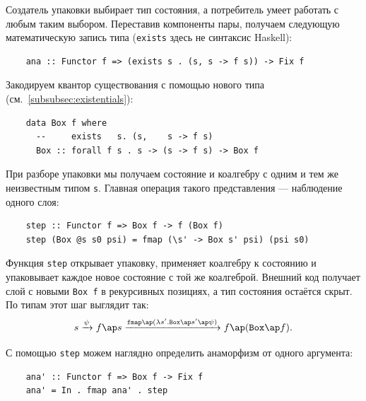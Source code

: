Создатель упаковки выбирает тип состояния, а потребитель умеет работать с любым таким выбором.
Переставив компоненты пары, получаем следующую математическую запись типа (\texttt{exists} здесь не синтаксис Haskell):
\begin{verbatim}
    ana :: Functor f => (exists s . (s, s -> f s)) -> Fix f
\end{verbatim}
Закодируем квантор существования с помощью нового типа (см.~\ref{subsubsec:existentials}):
\begin{verbatim}
    data Box f where
      --     exists   s. (s,    s -> f s)
      Box :: forall f s . s -> (s -> f s) -> Box f
\end{verbatim}

При разборе упаковки мы получаем состояние и коалгебру с одним и тем же неизвестным типом \texttt{s}.
Главная операция такого представления --- наблюдение одного слоя:
\begin{verbatim}
    step :: Functor f => Box f -> f (Box f)
    step (Box @s s0 psi) = fmap (\s' -> Box s' psi) (psi s0)
\end{verbatim}
Функция \texttt{step} открывает упаковку, применяет коалгебру к состоянию и упаковывает каждое новое состояние с той же коалгеброй.
Внешний код получает слой с новыми \texttt{Box f} в рекурсивных позициях, а тип состояния остаётся скрыт.
По типам этот шаг выглядит так:
\[
    s \xrightarrow{\psi} f\ap s
    \xrightarrow{\texttt{fmap}\ap(\lambda s'\ldotp\texttt{Box}\ap s'\ap\psi)}
    f\ap(\texttt{Box}\ap f).
\]

С помощью \texttt{step} можем наглядно определить анаморфизм от одного аргумента:
\begin{verbatim}
    ana' :: Functor f => Box f -> Fix f
    ana' = In . fmap ana' . step
\end{verbatim}

